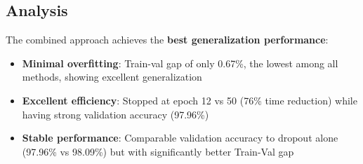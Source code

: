 \subsection{Analysis}

The combined approach achieves the \textbf{best generalization performance}:
\begin{itemize}
    \item \textbf{Minimal overfitting}: Train-val gap of only 0.67\%, the lowest among all methods, showing excellent generalization
    \item \textbf{Excellent efficiency}: Stopped at epoch 12 vs 50 (76\% time reduction) while having strong validation accuracy (97.96\%)
    \item \textbf{Stable performance}: Comparable validation accuracy to dropout alone (97.96\% vs 98.09\%) but with significantly better Train-Val gap
\end{itemize}
